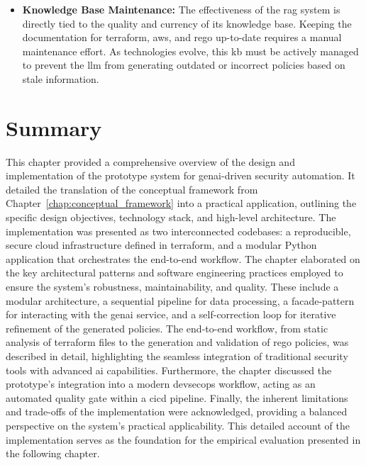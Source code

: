 \begin{itemize}
    \item \textbf{Knowledge Base Maintenance:} The effectiveness of the \gls{rag} system is directly tied to the quality and currency of its knowledge base. Keeping the documentation for \gls{terraform}, \gls{aws}, and \gls{rego} up-to-date requires a manual maintenance effort. As technologies evolve, this \gls{kb} must be actively managed to prevent the \gls{llm} from generating outdated or incorrect policies based on stale information.
\end{itemize}

\section{Summary}

This chapter provided a comprehensive overview of the design and implementation of the prototype system for \gls{genai}-driven security automation. It detailed the translation of the conceptual framework from Chapter~\ref{chap:conceptual_framework} into a practical application, outlining the specific design objectives, technology stack, and high-level architecture. The implementation was presented as two interconnected codebases: a reproducible, secure cloud infrastructure defined in \gls{terraform}, and a modular Python application that orchestrates the end-to-end workflow. The chapter elaborated on the key architectural patterns and software engineering practices employed to ensure the system's robustness, maintainability, and quality. These include a modular architecture, a sequential pipeline for data processing, a \gls{facade-pattern} for interacting with the \gls{genai} service, and a self-correction loop for iterative refinement of the generated policies. The end-to-end workflow, from static analysis of \gls{terraform} files to the generation and validation of \gls{rego} policies, was described in detail, highlighting the seamless integration of traditional security tools with advanced \gls{ai} capabilities. Furthermore, the chapter discussed the prototype's integration into a modern \gls{devsecops} workflow, acting as an automated quality gate within a \gls{cicd} pipeline. Finally, the inherent limitations and trade-offs of the implementation were acknowledged, providing a balanced perspective on the system's practical applicability. This detailed account of the implementation serves as the foundation for the empirical evaluation presented in the following chapter.
